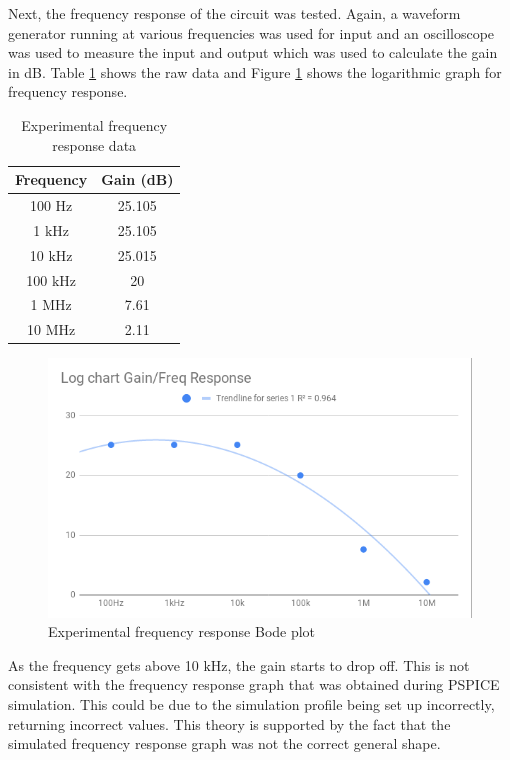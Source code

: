 \documentclass[11pt]{article}
\begin{document}
	Next, the frequency response of the circuit was tested. Again, a waveform generator 
	running at various frequencies was used for input and an oscilloscope was used to measure the 
	input and output which was used to calculate the gain in dB. Table \ref{table:exp_freq_response}
	shows the raw data and Figure \ref{fig:exp_freq_response} shows the logarithmic graph for 
	frequency response.

	\begin{table}[H]
		\centering
		\caption{Experimental frequency response data}
		\label{table:exp_freq_response}
		\begin{tabular}{|c|c|}
			\hline
			\textbf{Frequency} & \textbf{Gain (dB)}\\
			\hline
			100 $\si\hertz$ & 25.105\\
			1 $\si{\kilo\hertz}$ & 25.105\\
			10 $\si{\kilo\hertz}$ & 25.015\\
			100 $\si{\kilo\hertz}$ & 20\\
			1 $\si{\mega\hertz}$ & 7.61\\
			10 $\si{\mega\hertz}$ & 2.11\\
			\hline
		\end{tabular}
	\end{table}

	\begin{figure}[H]
		\includegraphics[width=\textwidth]{experimental_freq_response.png}
		\caption{Experimental frequency response Bode plot}
		\label{fig:exp_freq_response}
	\end{figure}

	As the frequency gets above 10 $\si{\kilo\hertz}$, the gain starts to drop off.
	This is not consistent with the frequency response graph that was obtained during
	PSPICE simulation. This could be due to the simulation profile being set up incorrectly, 
	returning incorrect values. This theory is supported by the fact that the simulated
	frequency response graph was not the correct general shape. 
\end{document}

